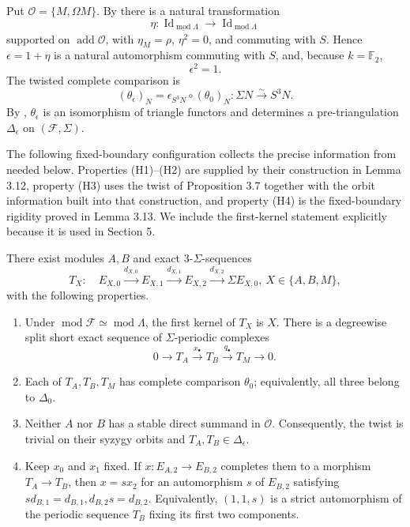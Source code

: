 \documentclass[12pt, twoside]{article}
\numberwithin{equation}{section}
\begin{document}
Put $\mathcal O=\{M,\Omega M\}$. By \cite[Proposition 3.7]{CLLZ} there is a natural transformation
\[
\eta:\operatorname{Id}_{\underline{\operatorname{mod}}\Lambda}
\longrightarrow
\operatorname{Id}_{\underline{\operatorname{mod}}\Lambda}
\]
supported on $\operatorname{add}\mathcal O$, with $\eta_M=\rho$, $\eta^2=0$, and commuting with $S$. Hence
$
\epsilon=1+\eta
$
is a natural automorphism commuting with $S$, and, because $k=\mathbb F_2$,
\begin{equation}\label{eq:epsilon-involution}
\epsilon^2=1.
\end{equation}
The twisted complete comparison is
\begin{equation}\label{eq:thetaepsilon}
(\theta_\epsilon)_N
=\epsilon_{S^3N}\circ(\theta_0)_N:
\Sigma N\xrightarrow{\sim}S^3N.
\end{equation}
By \cite[Proposition 3.7 and Corollary 3.8]{CLLZ}, $\theta_\epsilon$ is an isomorphism of triangle functors and determines a pre-triangulation $\Delta_\epsilon$ on $(\mathcal F,\Sigma)$.

The following fixed-boundary configuration collects the precise information from \cite{CLLZ} needed below. Properties (H1)--(H2) are supplied by their construction in Lemma 3.12, property (H3) uses the twist of Proposition 3.7 together with the orbit information built into that construction, and property (H4) is the fixed-boundary rigidity proved in Lemma 3.13. We include the first-kernel statement explicitly because it is used in Section 5.

\begin{lemma}\rm\cite[Propositions 3.7 and 3.11, Lemmas 3.12--3.13]{CLLZ}\label{lem:CLLZ}
There exist modules $A,B$ and exact $3$-$\Sigma$-sequences
\[
T_X:\quad E_{X,0}\xrightarrow{d_{X,0}}E_{X,1}
\xrightarrow{d_{X,1}}E_{X,2}
\xrightarrow{d_{X,2}}\Sigma E_{X,0},
~ X\in\{A,B,M\},
\]
with the following properties.
\begin{enumerate}
\item[(H1)] Under $\operatorname{mod}\mathcal F\simeq\operatorname{mod}\Lambda$, the first kernel of $T_X$ is $X$. There is a degreewise split short exact sequence of $\Sigma$-periodic complexes
\begin{equation}\label{eq:CLLZ-ses}
0\longrightarrow T_A\xrightarrow{x_\bullet}T_B\xrightarrow{q_\bullet}T_M\longrightarrow0.
\end{equation}
\item[(H2)] Each of $T_A,T_B,T_M$ has complete comparison $\theta_0$; equivalently, all three belong to $\Delta_0$.
\item[(H3)] Neither $A$ nor $B$ has a stable direct summand in $\mathcal O$. Consequently, the twist is trivial on their syzygy orbits and
$
T_A,T_B\in\Delta_\epsilon.
$
\item[(H4)] Keep $x_0$ and $x_1$ fixed. If
$x:E_{A,2}\to E_{B,2}$ completes them to a morphism $T_A\to T_B$, then
$
x=sx_2
$
for an automorphism $s$ of $E_{B,2}$ satisfying
$
sd_{B,1}=d_{B,1}, d_{B,2}s=d_{B,2}.
$
Equivalently, $(1,1,s)$ is a strict automorphism of the periodic sequence $T_B$ fixing its first two components.
\end{enumerate}
\end{lemma}
\end{document}
